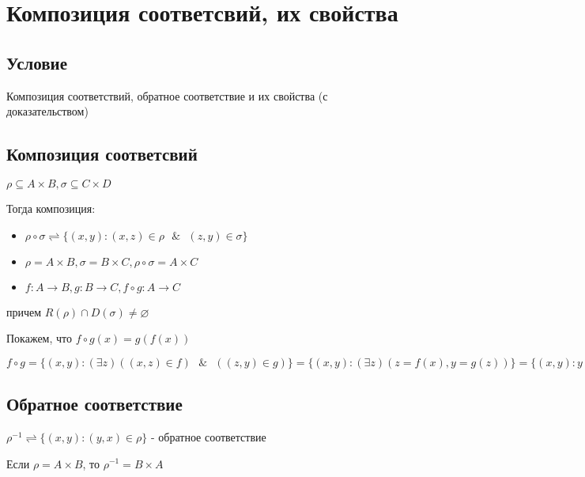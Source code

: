 \documentclass{report}
\newcommand{\band}{\mbox{ } \& \mbox{ }}
\begin{document}
\section{Композиция соответсвий, их свойства}
\subsection{Условие}
Композиция соответствий, обратное соответствие и их свойства (с доказательством)

\subsection{Композиция соответсвий}
$\rho \subseteq A \times B, \sigma \subseteq C \times D$

\medskip

Тогда композиция:
\begin{itemize}
	\item $\rho \circ \sigma \rightleftharpoons \{(x,y): (x,z) \in \rho \band (z,y) \in \sigma\}$
	\item  $\rho = A \times B, \sigma = B \times C, \rho \circ \sigma = A \times C$
	\item $f: A \rightarrow B, g: B \rightarrow C, f \circ g: A \rightarrow C$
\end{itemize}
причем $R(\rho) \cap D(\sigma) \neq \varnothing$

\medskip

Покажем, что $f \circ g(x) = g(f(x))$

\medskip

$f \circ g = \{(x,y): (\exists z)((x,z) \in f) \band ((z,y) \in g)\} = \{(x,y):(\exists z)(z = f(x), y = g(z))\} = \{(x,y): y = g(f(x))\}$

\subsection{Обратное соответствие}
$\rho^{-1} \rightleftharpoons \{(x,y): (y,x) \in \rho\}$ - обратное соответствие


Если $\rho = A \times B$, то $\rho^{-1} = B \times A$
\end{document}

